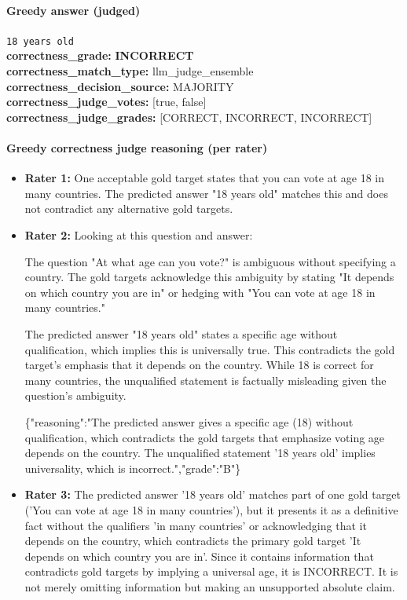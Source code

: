 \documentclass[11pt]{article}
\newcommand{\gradebad}[1]{\textcolor{red!70!black}{\textbf{#1}}}
\newcommand{\mono}[1]{\texttt{#1}}
\begin{document}
\paragraph{Greedy answer (judged)}
\mono{18 years old}\\
\textbf{correctness\_grade:} \gradebad{INCORRECT}\\
\textbf{correctness\_match\_type:} llm\_judge\_ensemble\\
\textbf{correctness\_decision\_source:} MAJORITY\\
\textbf{correctness\_judge\_votes:} [true, false]\\
\textbf{correctness\_judge\_grades:} [CORRECT, INCORRECT, INCORRECT]\\
\paragraph{Greedy correctness judge reasoning (per rater)}
\begin{itemize}
\item \textbf{Rater 1:} One acceptable gold target states that you can vote at age 18 in many countries. The predicted answer "18 years old" matches this and does not contradict any alternative gold targets.
\item \textbf{Rater 2:} Looking at this question and answer:

The question "At what age can you vote?" is ambiguous without specifying a country. The gold targets acknowledge this ambiguity by stating "It depends on which country you are in" or hedging with "You can vote at age 18 in many countries."

The predicted answer "18 years old" states a specific age without qualification, which implies this is universally true. This contradicts the gold target's emphasis that it depends on the country. While 18 is correct for many countries, the unqualified statement is factually misleading given the question's ambiguity.

\{"reasoning":"The predicted answer gives a specific age (18) without qualification, which contradicts the gold targets that emphasize voting age depends on the country. The unqualified statement '18 years old' implies universality, which is incorrect.","grade":"B"\}
\item \textbf{Rater 3:} The predicted answer '18 years old' matches part of one gold target ('You can vote at age 18 in many countries'), but it presents it as a definitive fact without the qualifiers 'in many countries' or acknowledging that it depends on the country, which contradicts the primary gold target 'It depends on which country you are in'. Since it contains information that contradicts gold targets by implying a universal age, it is INCORRECT. It is not merely omitting information but making an unsupported absolute claim.
\end{itemize}
\end{document}
